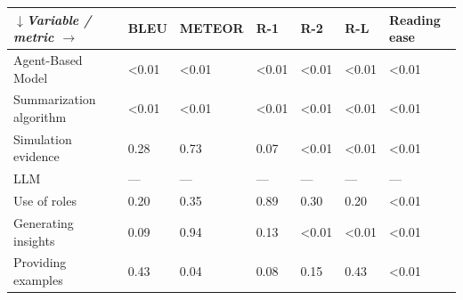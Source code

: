 \begin{tabular}{|l|l|l|l|l|l|l|}
\hline
\textit{$\downarrow$Variable / metric $\rightarrow$} & BLEU & METEOR & R-1 & R-2 & R-L & Reading ease \\
 \hline
 Agent-Based Model & \textless{}0.01 & \textless{}0.01 & \textless{}0.01 & \textless{}0.01 & \textless{}0.01 & \textless{}0.01 \\
 \hline
 Summarization algorithm & \textless{}0.01 & \textless{}0.01 & \textless{}0.01 & \textless{}0.01 & \textless{}0.01 & \textless{}0.01 \\
 \hline
 Simulation evidence & 0.28 & 0.73 & 0.07 & \textless{}0.01 & \textless{}0.01 & \textless{}0.01 \\
 \hline
 LLM & — & — & — & — & — & — \\
 \hline
 Use of roles & 0.20 & 0.35 & 0.89 & 0.30 & 0.20 & \textless{}0.01 \\
 \hline
 Generating insights & 0.09 & 0.94 & 0.13 & \textless{}0.01 & \textless{}0.01 & \textless{}0.01 \\
 \hline
 Providing examples & 0.43 & 0.04 & 0.08 & 0.15 & 0.43 & \textless{}0.01 \\
\hline
\end{tabular}
